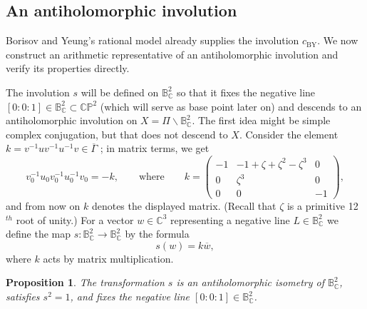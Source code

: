 \documentclass[11pt]{amsart}
\newtheorem{proposition}[theorem]{Proposition}
\theoremstyle{definition}
\theoremstyle{remark}
\newcommand{\C}{\mathbb C}
\newcommand{\CP}{\mathbb{CP}}
\newcommand{\B}{\mathbb B^2_{\C}}
\newcommand{\GammaMax}{\overline\Gamma}
\newcommand{\PiCS}{\Pi}
\begin{document}
\subsection{An antiholomorphic involution}
Borisov and Yeung's rational model already supplies the involution
$c_{\mathrm{BY}}$.  We now construct an arithmetic representative of
an antiholomorphic involution and verify its properties directly.

The involution $s$ will be defined on $\B$ so that it
fixes the negative line $[0:0:1]\in \B\subset \CP ^2$ (which will serve as base point later on) and 
descends to an
antiholomorphic involution on $X=\PiCS\backslash\B$.
The first idea might be simple
complex conjugation, but that does not descend to $X$.
Consider the element
$ k=v^{-1}uv^{-1}u^{-1}v\in\GammaMax$ ;
in matrix terms, we get
\[
 v_0^{-1}u_0v_0^{-1}u_0^{-1}v_0=-k,
 \qquad\text{where}\qquad
 k=
 \begin{pmatrix}
 -1&-1+\zeta+\zeta^2-\zeta^3&0\\
 0&\zeta^3&0\\
 0&0&-1
 \end{pmatrix},
\]
and from now on $k$ denotes the displayed matrix.
(Recall that $\zeta$ is a primitive 12$^{th}$ root of unity.)
For a vector $w\in \C ^3$ representing a negative line $L\in \B$ we define
the map $s\colon \B\to \B$ by the formula
\[
 s(w)=k {\overline {w}}, 
\]
where $k$ acts by matrix
multiplication.

\begin{proposition}\label{prop:antiunitary}
The transformation $s$ is an antiholomorphic isometry of $\B$, satisfies
$s^2=1$, and fixes the negative line
$[0:0:1]\in\B$.
\end{proposition}
\end{document}
